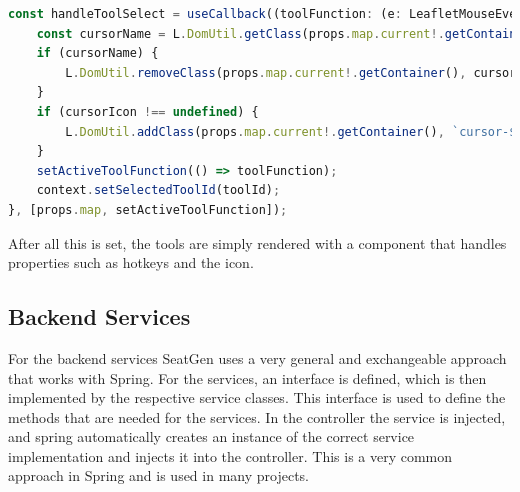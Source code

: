 \begin{lstlisting}[language=TypeScript,caption={Handle tool select function},label={lst:handle-tool-select}]
const handleToolSelect = useCallback((toolFunction: (e: LeafletMouseEvent) => void, toolId: string, cursorIcon?: string) => {
    const cursorName = L.DomUtil.getClass(props.map.current!.getContainer()).split(" ").find((it) => it.startsWith("cursor-"));
    if (cursorName) {
        L.DomUtil.removeClass(props.map.current!.getContainer(), cursorName);
    }
    if (cursorIcon !== undefined) {
        L.DomUtil.addClass(props.map.current!.getContainer(), `cursor-${cursorIcon}`);
    }
    setActiveToolFunction(() => toolFunction);
    context.setSelectedToolId(toolId);
}, [props.map, setActiveToolFunction]);
\end{lstlisting}

After all this is set, the tools are simply rendered with a component that handles properties such as hotkeys and the icon.

\subsection{Backend Services}
For the backend services SeatGen uses a very general and exchangeable approach that works with Spring. For the services, an interface is defined, which is then implemented by the respective service classes. This interface is used to define the methods that are needed for the services. In the controller the service is injected, and spring automatically creates an instance of the correct service implementation and injects it into the controller. This is a very common approach in Spring and is used in many projects.